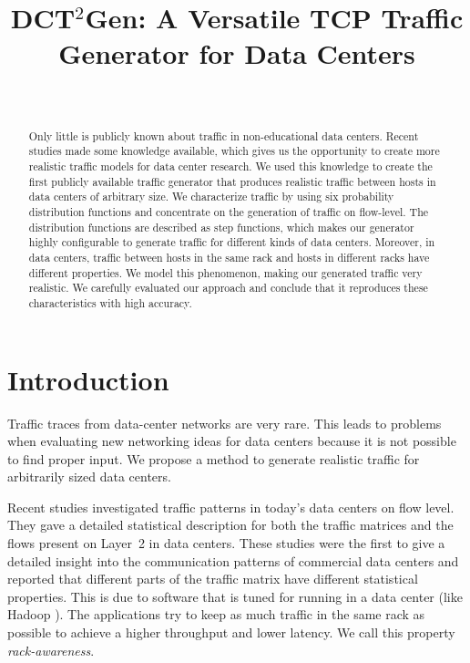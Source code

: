 \documentclass[journal,10pt]{IEEEtran}
\newcommand{\genname}{DCT${^2}$Gen}
\begin{document}
\title{\genname{}: A Versatile TCP Traffic Generator for Data Centers}
\author{\\
}

\maketitle

\begin{abstract}
	Only little is publicly known about traffic in non-educational data centers.
	Recent studies made some knowledge available, which gives us the opportunity to create more realistic traffic models for
	data center research.
	We used this knowledge to create the first publicly available traffic generator that produces realistic traffic between hosts in 
	data centers of arbitrary size.
	We characterize traffic by using six probability distribution functions and concentrate on the generation 
	of traffic on flow-level.
	The distribution functions are described as step functions, which makes our generator highly configurable 
	to generate traffic for different kinds of data centers.
	Moreover, in data centers,
	traffic between hosts in the same rack and hosts in different racks have different properties.
	We model this phenomenon, making our generated traffic very realistic.	
	We carefully evaluated our approach and conclude that it reproduces these characteristics with high accuracy.
	
	
	


\end{abstract}


\section{Introduction}


Traffic traces from data-center networks are very rare. This leads to problems when evaluating new networking ideas for data centers because
it is not possible to find proper input. 
We propose a method to generate realistic traffic for arbitrarily sized data centers.

Recent studies \cite{MSR-datacenters, datacentersInTheWild} investigated traffic patterns in today's data centers on flow level.
They gave a detailed statistical description for both the traffic matrices and the flows present on Layer~2 in data centers.
These studies were the first to give a detailed insight into the communication patterns of commercial data centers
and reported that different parts of the traffic matrix have different statistical properties. 
This is due to 
software that is tuned for running in a data center (like Hadoop \cite{hadoop}). The applications try to keep as much traffic in the same rack as possible
to achieve a higher throughput and lower latency. We call this property \emph{rack-awareness}.
\end{document}
